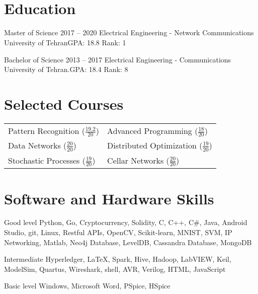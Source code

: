 \documentclass{tccv}
\begin{document}
	\textbf{\\ \\}
	
	\section{Education}
	\begin{yearlist}
		\item[Master of Science]{2017 -- 2020}
		{Electrical Engineering - Network Communications}
		{University of Tehran\newline GPA: 18.8 \newline Rank: 1}
		
		\item[Bachelor of Science]{2013 -- 2017}
		{Electrical Engineering - Communications}
		{University of Tehran.\newline GPA: 18.4 \newline Rank: 8}
	\end{yearlist}
	
	\section{Selected Courses}
	\begin{tabular}{ll}
		Pattern Recognition ($\frac{19.2}{20}$)	&Advanced Programming ($\frac{18}{20}$) \\
		Data Networks ($\frac{20}{20}$)			&Distributed Optimization ($\frac{19}{20}$) \\
		Stochastic Processes ($\frac{19}{20}$)	&Cellar Networks ($\frac{20}{20}$)
	\end{tabular}
	
	\section{Software and Hardware Skills}
	\begin{factlist}
		
		\item{Good level}
		{Python, Go, Cryptocurrency, Solidity, C, C++, C\#, Java, Android Studio, git, Linux, Restful APIs, OpenCV, Scikit-learn, MNIST, SVM, IP Networking, Matlab, Neo4j Database, LevelDB, Cassandra Database, MongoDB}
		
		\item{Intermediate}
		{Hyperledger, \LaTeX, Spark, Hive, Hadoop, LabVIEW, Keil, ModelSim, Quartus,
			Wireshark, shell, AVR, Verilog, HTML, JavaScript}
		
		\item{Basic level}
		{Windows, Microsoft Word, PSpice, HSpice}
		
	\end{factlist}
	
\end{document}
